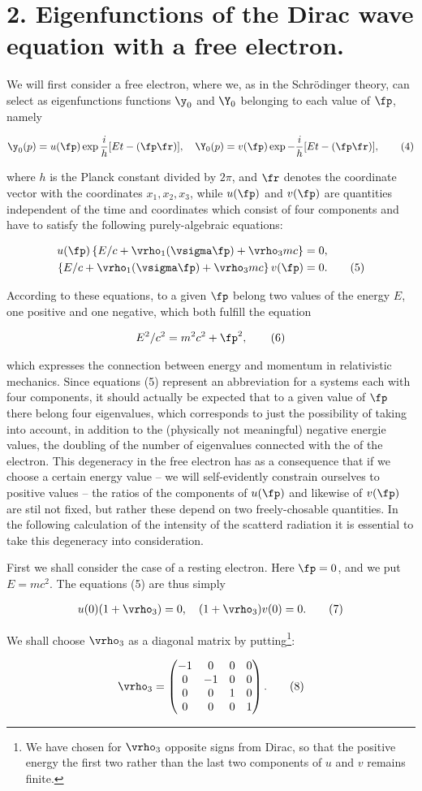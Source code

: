 \documentclass{article}
\newcommand{\nequ}[2]{
\begin{align*}
#1
\tag{#2}
\end{align*}
}
\begin{document}
\section*{2. Eigenfunctions of the Dirac wave equation with a free electron.}

We will first consider a free electron, where we, as in the Schr\"odinger theory, can select as eigenfunctions functions $\y_0$ and $\Y_0$ belonging to each value of $\fp$, namely
\nequ{
\y_0(p) = u(\fp)\exp{\frac{i}{h}[Et - (\fp\fr)]}, \quad
\Y_0(p) = v(\fp)\exp{-\frac{i}{h}[Et - (\fp\fr)]},
}{4}
where $h$ is the Planck constant divided by $2\pi$, and $\fr$ denotes the coordinate vector with the coordinates $x_1,x_2,x_3$, while $u(\fp)$ and $v(\fp)$ are quantities independent of the time and coordinates which consist of four components and have to satisfy the following purely-algebraic equations:
\nequ{
u(\fp)\left\{E/c + \vrho_1(\vsigma \fp) + \vrho_3 mc \right\} &= 0,\\
\left\{E/c + \vrho_1(\vsigma \fp) + \vrho_3 mc \right\}v(\fp) &= 0.
}{5}
According to these equations, to a given $\fp$ belong two values of the energy $E$, one positive and one negative, which both fulfill the equation
\nequ{
E^2/c^2 = m^2 c^2 + \fp^2,
}{6}
which expresses the connection between energy and momentum in relativistic mechanics. Since equations (5) represent an abbreviation for a systems each with four components, it should actually be expected that to a given value of $\fp$ there belong four eigenvalues, which corresponds to just the possibility of taking into account, in addition to the (physically not meaningful) negative energie values, the doubling of the number of eigenvalues connected with the  of the electron. This degeneracy in the free electron has as a consequence that if we choose a certain energy value -- we will self-evidently constrain ourselves to positive values -- the ratios of the components of $u(\fp)$ and likewise of $v(\fp)$ are stil not fixed, but rather these depend on two freely-chosable quantities. In the following calculation of the intensity of the scatterd radiation it is essential to take this degeneracy into consideration.

First we shall consider the case of a resting electron. Here $\fp=0$, and we put $E=mc^2$. The equations (5) are thus simply
\nequ{
u(0)(1+\vrho_3) = 0, \quad
(1+\vrho_3)v(0) = 0.
}{7}

We shall choose $\vrho_3$ as a diagonal matrix by putting\footnote{We have chosen for $\vrho_3$  opposite signs from Dirac, so that the positive energy  the first two rather than the last two components of $u$ and $v$ remains finite.}:
\nequ{
\vrho_3 = \left(\begin{matrix}
-1  & 0  & 0 & 0\\
 0  &-1  & 0 & 0\\
 0  & 0  & 1 & 0\\
 0  & 0  & 0 & 1
\end{matrix}\right).
}{8}
\end{document}
